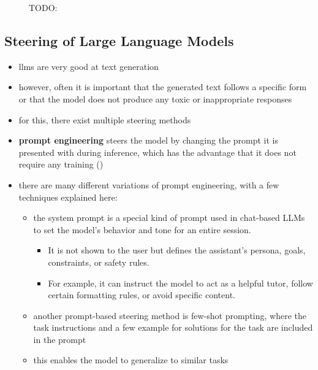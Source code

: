 \begin{figure}[ht]
  \begin{center}
    
  \end{center}
  \caption{TODO:} %
  \label{fig:transformerArchitecture}
\end{figure}

\subsection{Steering of Large Language Models}
\label{sec:background:llm:steering}
\begin{itemize}
  \item \acp{llm} are very good at text generation
  \item however, often it is important that the generated text follows a specific form or that the model does not produce any toxic or inappropriate responses
  \item for this, there exist multiple steering methods
  \item \textbf{prompt engineering} steers the model by changing the prompt it is presented with during inference, which has the advantage that it does not require any training (\cite{schulhoffPromptReportSystematic2024})
  \item there are many different variations of prompt engineering, with a few techniques explained here:
        \begin{itemize}
          \item the system prompt is a special kind of prompt used in chat-based LLMs to set the model's behavior and tone for an entire session.
                \begin{itemize}
                  \item It is not shown to the user but defines the assistant's persona, goals, constraints, or safety rules.
                  \item For example, it can instruct the model to act as a helpful tutor, follow certain formatting rules, or avoid specific content.
                \end{itemize}
          \item another prompt-based steering method is few-shot prompting, where the task instructions and a few example for solutions for the task are included in the prompt
          \item this enables the model to generalize to similar tasks

\end{itemize}
\end{itemize}
